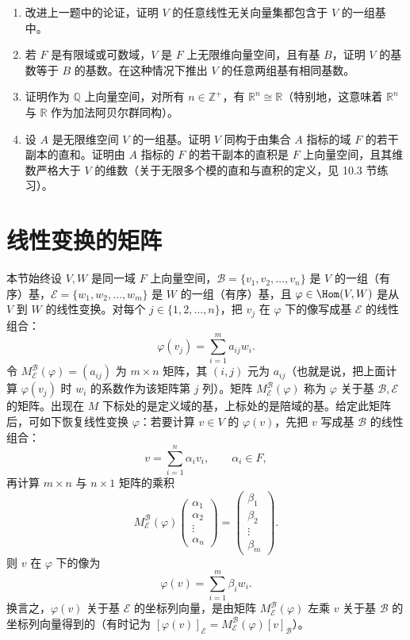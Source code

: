 \begin{enumerate}[label=\arabic*.]
\item 改进上一题中的论证，证明 $V$ 的任意线性无关向量集都包含于 $V$ 的一组基中。
\item 若 $F$ 是有限域或可数域，$V$ 是 $F$ 上无限维向量空间，且有基 $B$，证明 $V$ 的基数等于 $B$ 的基数。在这种情况下推出 $V$ 的任意两组基有相同基数。
\item 证明作为 $\mathbb Q$ 上向量空间，对所有 $n\in\mathbb Z^+$，有 $\mathbb R^n\cong\mathbb R$（特别地，这意味着 $\mathbb R^n$ 与 $\mathbb R$ 作为加法阿贝尔群同构）。
\item 设 $A$ 是无限维空间 $V$ 的一组基。证明 $V$ 同构于由集合 $A$ 指标的域 $F$ 的若干副本的直和。证明由 $A$ 指标的 $F$ 的若干副本的直积是 $F$ 上向量空间，且其维数严格大于 $V$ 的维数（关于无限多个模的直和与直积的定义，见 10.3 节练习）。
\end{enumerate}

\section{线性变换的矩阵}

本节始终设 $V,W$ 是同一域 $F$ 上向量空间，$\mathcal B=\{v_1,v_2,\ldots,v_n\}$ 是 $V$ 的一组（有序）基，$\mathcal E=\{w_1,w_2,\ldots,w_m\}$ 是 $W$ 的一组（有序）基，且 $\varphi\in\Hom(V,W)$ 是从 $V$ 到 $W$ 的线性变换。对每个 $j\in\{1,2,\ldots,n\}$，把 $v_j$ 在 $\varphi$ 下的像写成基 $\mathcal E$ 的线性组合：
\begin{equation}
\varphi(v_j)=\sum_{i=1}^m a_{ij}w_i. \tag{11.3}
\end{equation}
令 $M_{\mathcal E}^{\mathcal B}(\varphi)=(a_{ij})$ 为 $m\times n$ 矩阵，其 $(i,j)$ 元为 $a_{ij}$（也就是说，把上面计算 $\varphi(v_j)$ 时 $w_i$ 的系数作为该矩阵第 $j$ 列）。矩阵 $M_{\mathcal E}^{\mathcal B}(\varphi)$ 称为 $\varphi$ 关于基 $\mathcal B,\mathcal E$ 的矩阵。出现在 $M$ 下标处的是定义域的基，上标处的是陪域的基。给定此矩阵后，可如下恢复线性变换 $\varphi$：若要计算 $v\in V$ 的 $\varphi(v)$，先把 $v$ 写成基 $\mathcal B$ 的线性组合：
\[
v=\sum_{i=1}^n\alpha_i v_i,
\qquad \alpha_i\in F,
\]
再计算 $m\times n$ 与 $n\times1$ 矩阵的乘积
\[
M_{\mathcal E}^{\mathcal B}(\varphi)
\begin{pmatrix}\alpha_1\\ \alpha_2\\ \vdots\\ \alpha_n\end{pmatrix}
=
\begin{pmatrix}\beta_1\\ \beta_2\\ \vdots\\ \beta_m\end{pmatrix}.
\]
则 $v$ 在 $\varphi$ 下的像为
\[
\varphi(v)=\sum_{i=1}^m\beta_iw_i.
\]
换言之，$\varphi(v)$ 关于基 $\mathcal E$ 的坐标列向量，是由矩阵 $M_{\mathcal E}^{\mathcal B}(\varphi)$ 左乘 $v$ 关于基 $\mathcal B$ 的坐标列向量得到的（有时记为 $[\varphi(v)]_{\mathcal E}=M_{\mathcal E}^{\mathcal B}(\varphi)[v]_{\mathcal B}$）。

